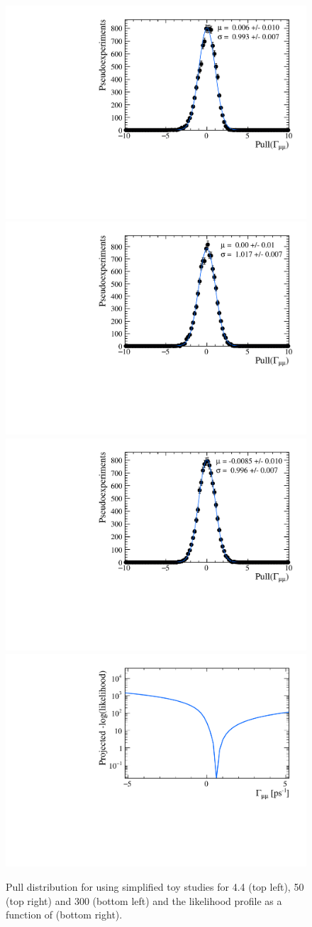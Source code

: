 {\begin{figure}[htbp]
    \centering
       \includegraphics[width=0.49 \textwidth]{./Figs/LifetimeMeasurement/CKM_simple_gamma_pull.pdf}
     \includegraphics[width= 0.49 \textwidth]{./Figs/LifetimeMeasurement/50fb_gamma_pull.pdf}
      \includegraphics[width=0.49 \textwidth]{./Figs/LifetimeMeasurement/300fb_simple_gamma_pull.pdf}
        \includegraphics[width= 0.49 \textwidth]{./Figs/LifetimeMeasurement/Gamma_LL.pdf}  

  \caption{Pull distribution for \Gmumu using simplified toy studies for 4.4 (top left), 50 (top right) and 300 (bottom left) \fb and the likelihood profile as a function of \Gmumu (bottom right).}
    \label{fig:gammapulls}
\end{figure}




}
